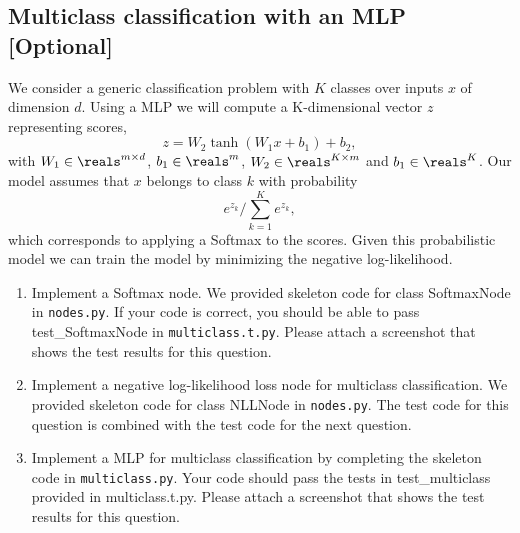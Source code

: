 \documentclass{article}
\theoremstyle{plain}
\theoremstyle{definition}
\begin{document}
\subsection{Multiclass classification with an MLP [Optional]}
We consider a generic classification problem with $K$ classes over inputs 
$x$ of dimension $d$. Using a MLP we will compute a K-dimensional vector $z$ representing scores, 
$$
z = W_2 \tanh (W_1 x + b_1) + b_2,
$$
with $W_1 \in \reals^{m\times d}$, $b_1 \in \reals^m$, $W_2 \in \reals^{K \times m}$ and $b_1 \in \reals^K$.
Our model assumes that $x$ belongs to class $k$ with probability $$ e^{z_k}/\sum_{k=1}^K e^{z_k},$$
which corresponds to applying a Softmax to the scores. Given this probabilistic model we can train the model by minimizing the negative log-likelihood.
\begin{enumerate}
\setcounter{enumi}{\value{saveenum}}
\item Implement a Softmax node. We provided skeleton code for class SoftmaxNode in \texttt{nodes.py}. If your code is correct, you should be able to pass test\_SoftmaxNode in \texttt{multiclass.t.py}. Please attach a screenshot that shows the test results for this question.
\item Implement a negative log-likelihood loss node for multiclass
classification. We provided skeleton code for class NLLNode in \texttt{nodes.py}. The test code for this question is combined with the test code for the next question. 
\item Implement a MLP for multiclass classification by completing the skeleton code in \texttt{multiclass.py}. Your code should pass the tests in test\_multiclass provided in multiclass.t.py. Please attach a screenshot that shows the test results for this question. 
\setcounter{saveenum}{\value{enumi}}
\end{enumerate}
\end{document}
